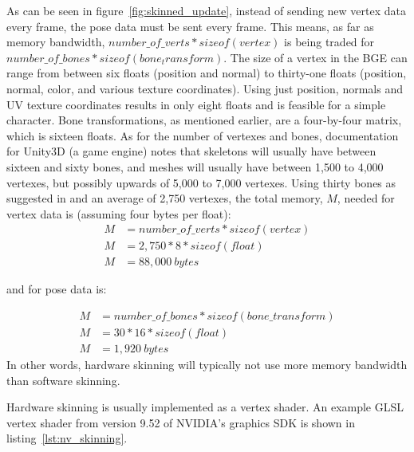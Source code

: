 As can be seen in figure~\ref{fig:skinned_update}, instead of sending new vertex data every frame, the pose data must be sent every frame.
This means, as far as memory bandwidth, $number\_of\_verts*sizeof(vertex)$ is being traded for $number\_of\_bones*sizeof(bone_transform)$.
The size of a vertex in the BGE can range from between six floats (position and normal) to thirty-one floats (position, normal, color, and various texture coordinates).
Using just position, normals and UV texture coordinates results in only eight floats and is feasible for a simple character.
Bone transformations, as mentioned earlier, are a four-by-four matrix, which is sixteen floats.
As for the number of vertexes and bones, documentation for Unity3D (a game engine) notes that skeletons will usually have between sixteen and sixty bones, and meshes will usually have between 1,500 to 4,000 vertexes, but possibly upwards of 5,000 to 7,000 vertexes\cite{unity_opt_char}.
Using thirty bones as suggested in \cite{unity_opt_char} and an average of 2,750 vertexes, the total memory, $M$, needed for vertex data is (assuming four bytes per float):
\begin{align*}
 M &= number\_of\_verts*sizeof(vertex)\\
 M &= 2,750 * 8 * sizeof(float)\\
 M &= 88,000\ bytes
\end{align*}

and for pose data is:

\begin{align*}
 M &= number\_of\_bones*sizeof(bone\_transform)\\
 M &= 30 * 16 * sizeof(float)\\
 M &= 1,920\ bytes
\end{align*}
In other words, hardware skinning will typically not use more memory bandwidth than software skinning.

Hardware skinning is usually implemented as a vertex shader.
An example GLSL vertex shader from version 9.52 of NVIDIA's graphics SDK\cite{nvidiasdk} is shown in listing~\ref{lst:nv_skinning}.


